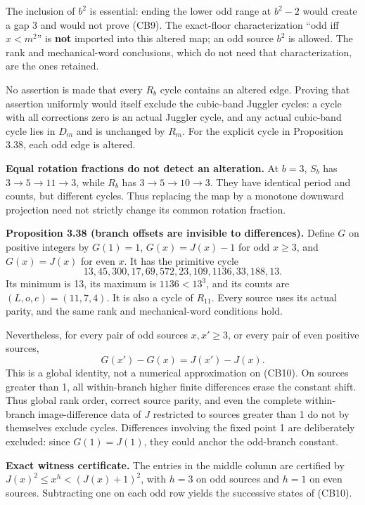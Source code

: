 \documentclass[12pt]{article}
\begin{document}
The inclusion of \(b^2\) is essential: ending the lower odd range at
\(b^2-2\) would create a gap 3 and would not prove (CB9). The
exact-floor characterization ``odd iff \(x<m^2\)'' is \textbf{not}
imported into this altered map; an odd source \(b^2\) is allowed. The
rank and mechanical-word conclusions, which do not need that
characterization, are the ones retained.

No assertion is made that every \(R_b\) cycle contains an altered edge.
Proving that assertion uniformly would itself exclude the cubic-band
Juggler cycles: a cycle with all corrections zero is an actual Juggler
cycle, and any actual cubic-band cycle lies in \(D_m\) and is unchanged
by \(R_m\). For the explicit cycle in Proposition 3.38, each odd edge is
altered.

\textbf{Equal rotation fractions do not detect an alteration.} At
\(b=3\), \(S_b\) has \(3\to5\to11\to3\), while \(R_b\) has
\(3\to5\to10\to3\). They have identical period and counts, but different
cycles. Thus replacing the map by a monotone downward projection need
not strictly change its common rotation fraction.

\textbf{Proposition 3.38 (branch offsets are invisible to differences).}
Define \(G\) on positive integers by \(G(1)=1\), \(G(x)=J(x)-1\) for odd
\(x\ge3\), and \(G(x)=J(x)\) for even \(x\). It has the primitive cycle
\[
13,45,300,17,69,572,23,109,1136,33,188,13.\tag{CB10}
\] Its minimum is 13, its maximum is \(1136<13^3\), and its counts are
\((L,o,e)=(11,7,4)\). It is also a cycle of \(R_{11}\). Every source
uses its actual parity, and the same rank and mechanical-word conditions
hold.

Nevertheless, for every pair of odd sources \(x,x'\ge3\), or every pair
of even positive sources, \[
G(x')-G(x)=J(x')-J(x).\tag{CB11}
\] This is a global identity, not a numerical approximation on (CB10).
On sources greater than 1, all within-branch higher finite differences
erase the constant shift. Thus global rank order, correct source parity,
and even the complete within-branch image-difference data of \(J\)
restricted to sources greater than 1 do not by themselves exclude
cycles. Differences involving the fixed point 1 are deliberately
excluded: since \(G(1)=J(1)\), they could anchor the odd-branch
constant.

\textbf{Exact witness certificate.} The entries in the middle column are
certified by \(J(x)^2\le x^h<(J(x)+1)^2\), with \(h=3\) on odd sources
and \(h=1\) on even sources. Subtracting one on each odd row yields the
successive states of (CB10).
\end{document}
